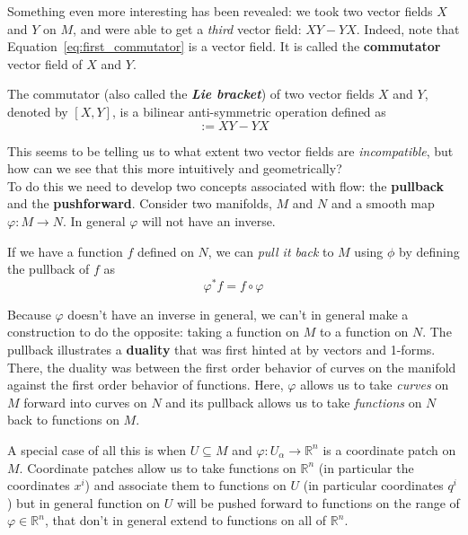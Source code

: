 \documentclass[../master.tex]{subfiles}
\begin{document}
		Something even more interesting has been revealed: we took two vector fields $X$ and $Y$ on $M$, and were able to get a \emph{third} vector field: $XY-YX$. Indeed, note that Equation~\eqref{eq:first_commutator} is a vector field. It is called the \textbf{commutator} vector field of $X$ and $Y$.
		\begin{defn}[Commutator]
			The commutator (also called the \textbf{\emph{Lie bracket}}) of two vector fields $X$ and $Y$, denoted by $[X,Y]$, is a bilinear anti-symmetric operation defined as
			\begin{equation}
				[X,Y] := X Y - Y X 
			\end{equation}
		\end{defn}
		This seems to be telling us to what extent two vector fields are \emph{incompatible}, but how can we see that this more intuitively and geometrically? \\
		
		To do this we need to develop two concepts associated with flow: the \textbf{pullback} and the \textbf{pushforward}. Consider two manifolds, $M$ and $N$ and a smooth map $\varphi: M \rightarrow N$. In general $\varphi$ will not have an inverse.
		\begin{defn}
			If we have a function $f$ defined on $N$, we can \emph{pull it back} to $M$ using $\phi$ by defining the pullback of $f$ as
			\begin{equation*}
				\varphi^* f = f \circ \varphi
			\end{equation*}
		\end{defn}
		Because $\varphi$ doesn't have an inverse in general, we can't in general make a construction to do the opposite: taking a function on $M$ to a function on $N$. The pullback illustrates a \textbf{duality} that was first hinted at by vectors and 1-forms. There, the duality was between the first order behavior of curves on the manifold against the first order behavior of functions. Here, $\varphi$ allows us to take \emph{curves} on $M$ forward into curves on $N$ and its pullback allows us to take \emph{functions} on $N$ back to functions on $M$. 
		
		A special case of all this is when $U \subseteq M$ and $\varphi: U_\alpha \rightarrow \mathbb R^n$ is a coordinate patch on $M$. Coordinate patches allow us to take functions on $\mathbb R^n$ (in particular the coordinates $x^i$) and associate them to functions on $U$ (in particular coordinates $q^i$) but in general function on $U$ will be pushed forward to functions on the range of $\varphi \in \mathbb R^n$, that don't in general extend to functions on all of $\mathbb R^n$.
		
\end{document}

